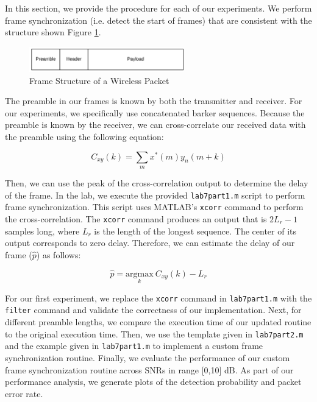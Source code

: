 \documentclass{article}
\begin{document}
In this section, we provide the procedure for each of our experiments. We perform frame synchronization (i.e. detect the start of frames) that are consistent with the structure shown Figure \ref{fig::frame_structure}.

\begin{figure}[H]
	\centerline{\includegraphics[width=0.6\textwidth]{frame_structure.png}}
	\caption{Frame Structure of a Wireless Packet}
	\label{fig::frame_structure}
\end{figure}

\noindent The preamble in our frames is known by both the transmitter and receiver. For our experiments, we specifically use concatenated barker sequences. Because the preamble is known by the receiver, we can cross-correlate our received data with the preamble using the following equation:

\begin{equation}
	C_{xy}(k) = \sum_{m}{x^*(m)y_n(m+k)}
\end{equation}

\noindent Then, we can use the peak of the cross-correlation output to determine the delay of the frame. In the lab, we execute the provided \texttt{lab7part1.m} script to perform frame synchronization. This script uses MATLAB's \texttt{xcorr} command to perform the cross-correlation. The \texttt{xcorr} command produces an output that is $2L_r - 1$ samples long, where $L_r$ is the length of the longest sequence. The center of its output corresponds to zero delay. Therefore, we can estimate the delay of our frame ($\hat{p}$) as follows:

\begin{equation}
	\hat{p} = \underset{k}{\text{argmax}}\ C_{xy}(k) - L_r
\end{equation}

\noindent For our first experiment, we replace the \texttt{xcorr} command in \texttt{lab7part1.m} with the \texttt{filter} command and validate the correctness of our implementation. Next, for different preamble lengths, we compare the execution time of our updated routine to the original execution time. Then, we use the template given in \texttt{lab7part2.m} and the example given in \texttt{lab7part1.m} to implement a custom frame synchronization routine. Finally, we evaluate the performance of our custom frame synchronization routine across SNRs in range [0,10] dB. As part of our performance analysis, we generate plots of the detection probability and packet error rate.
 
\end{document}
